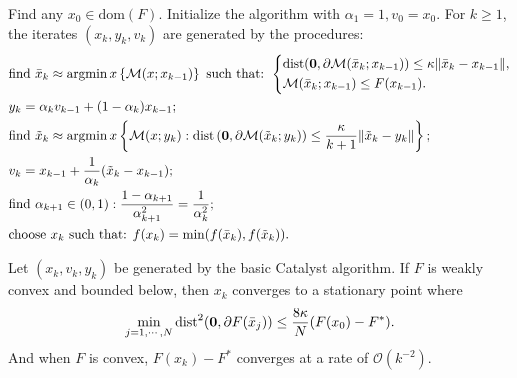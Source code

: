 \documentclass[12pt]{article}
\begin{document}
    \begin{definition}
        Find any $x_0 \in \text{dom}(F)$. 
        Initialize the algorithm with $\alpha_1 = 1, v_0 = x_0$. 
        For $k \ge 1$, the iterates $(x_k, y_k, v_k)$ are generated by the procedures: 
        \begin{align*}
            &
            \text{find } \bar x_k \approx \mathop{\rm argmin}\limits{x}\left\lbrace
                \mathcal M(x; x_{k - 1})
            \right\rbrace
            \text{ such that:  }
                \left\lbrace
                    \begin{aligned}
                        & \text{dist}(\mathbf 0, \partial \mathcal M(\bar x_k; x_{k - 1})) 
                        \le 
                        \kappa\Vert \bar x_k - x_{k - 1}\Vert, 
                        \\
                        & \mathcal M(\bar x_k; x_{k - 1}) 
                        \le F(x_{k - 1}). 
                    \end{aligned}
                \right.
            \\
            & y_k = \alpha_k v_{k - 1} + (1 - \alpha_k) x_{k - 1};
            \\
            & 
            \text{find }\tilde x_k \approx \mathop{\rm argmin}\limits{x} \left\lbrace
                \mathcal M(x; y_k) 
                : 
                \text{dist}\left(
                \mathbf 0, \partial \mathcal M(\tilde x_k; y_k)
                \right) 
                \le \frac{\kappa}{k + 1}\Vert \tilde x_k - y_k\Vert
            \right\rbrace;
            \\
            & v_{k} = x_{k - 1} + \frac{1}{\alpha_k}(\tilde x_k - x_{k - 1});
            \\
            & 
            \text{find } \alpha_{k + 1} \in (0, 1): 
            \frac{1 - \alpha_{k + 1}}{\alpha_{k + 1}^2} = \frac{1}{\alpha_k^2};
            \\
            & \text{choose } x_k \text{ such that:  } f(x_k) = \min(f(\bar x_k), f(\tilde x_k)). 
        \end{align*}
    \end{definition}
    
    \begin{theorem}
        Let $(x_k, v_k, y_k)$ be generated by the basic Catalyst algorithm. 
        If $F$ is weakly convex and bounded below, then $x_k$ converges to a stationary point where
        \begin{align*}
            \min_{j = 1, \cdots, N} \operatorname{dist}^2(\mathbf 0, \partial F(\bar x_j))
            \le \frac{8 \kappa}{N}(F(x_0) - F^*). 
        \end{align*}
        And when $F$ is convex, $F(x_k) - F^*$ converges at a rate of $\mathcal O(k^{-2})$. 
    \end{theorem}
    \begin{remark}
        
    \end{remark}
\end{document}
